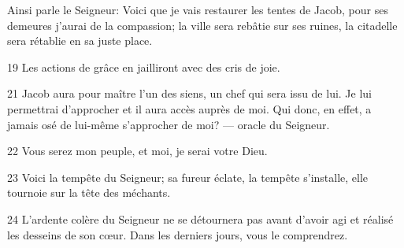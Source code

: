 Ainsi parle le Seigneur: Voici que je vais restaurer les tentes de Jacob, pour ses demeures j’aurai de la compassion; la ville sera rebâtie sur ses ruines, la citadelle sera rétablie en sa juste place.

19 Les actions de grâce en jailliront avec des cris de joie. 

21 Jacob aura pour maître l’un des siens, un chef qui sera issu de lui. Je lui permettrai d’approcher et il aura accès auprès de moi. Qui donc, en effet, a jamais osé de lui-même s’approcher de moi? --- oracle du Seigneur.

22 Vous serez mon peuple, et moi, je serai votre Dieu.

23 Voici la tempête du Seigneur; sa fureur éclate, la tempête s’installe, elle tournoie sur la tête des méchants.

24 L’ardente colère du Seigneur ne se détournera pas avant d’avoir agi et réalisé les desseins de son cœur. Dans les derniers jours, vous le comprendrez.